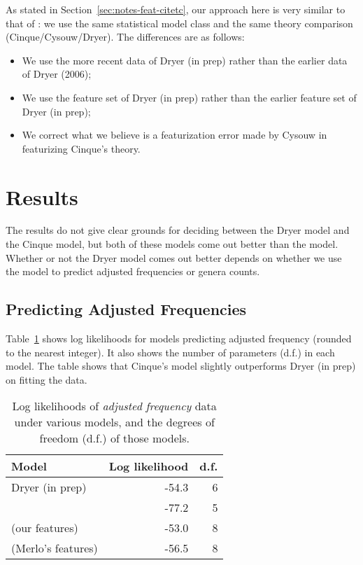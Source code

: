 \documentclass[11pt]{article}
\begin{document}
As stated in Section~\ref{sec:notes-feat-citetc}, our approach here is
very similar to that of \citet{cysouw2010dealing}: we use the same
statistical model class and the same theory comparison
(Cinque/Cysouw/Dryer).  The differences are as follows:
%
\begin{itemize}
\item We use the more recent data of Dryer (in prep) rather than the
  earlier data of Dryer (2006);
\item We use the feature set of Dryer (in prep) rather than the
  earlier feature set of Dryer (in prep);
\item We correct what we believe is a featurization error made by
  Cysouw in featurizing Cinque's theory.%
\end{itemize}


\section{Results}

The results do not give clear grounds for deciding between the Dryer model and the Cinque model, but both of these models come out better than the \citet{cysouw2010dealing} model. Whether or not the Dryer model comes out better depends on whether we use the model to predict adjusted frequencies or genera counts.

\subsection{Predicting Adjusted Frequencies}

Table~\ref{tab:af-likelihoods} shows log likelihoods for models predicting adjusted frequency (rounded to the nearest integer). It also shows the number of parameters (d.f.) in each model. The table shows that Cinque's model slightly outperforms Dryer (in prep) on fitting the data.

\begin{table}
  \centering
  \begin{tabular}{|l|r|r|}
    \hline
    Model & Log likelihood & d.f. \\
    \hline
    Dryer (in prep) & -54.3 & 6 \\
    \citet{cysouw2010dealing} & -77.2 & 5 \\
    \citet{cinque2005deriving} (our features) & -53.0 & 8 \\
    \citet{cinque2005deriving} (Merlo's features) & -56.5 & 8\\
    \hline
  \end{tabular}
  \caption{Log likelihoods of \emph{adjusted frequency} data under various models, and the degrees of freedom (d.f.) of those models.}
  \label{tab:af-likelihoods}
\end{table}
\end{document}
